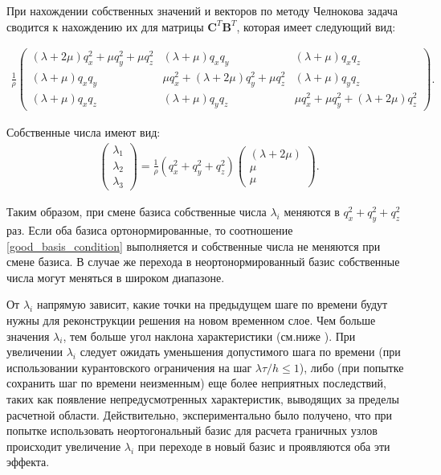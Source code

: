 При нахождении собственных значений и векторов по методу Челнокова \cite{chelnokov} задача сводится к нахождению их для матрицы $\mathbf{C}^T \mathbf{B}^T$, которая имеет следующий вид:

\begin{eqnarray}
\frac 1 \rho 
\left( \begin{array}{cccccccccccc}
(\lambda+2\mu) q_x^2 + \mu q_y^2 + \mu q_z^2 & (\lambda+\mu) q_x q_y & (\lambda+\mu) q_x q_z \\
(\lambda+\mu) q_x q_y & \mu q_x^2 + (\lambda+2\mu) q_y^2 + \mu q_z^2 & (\lambda+\mu) q_y q_z \\
(\lambda+\mu) q_x q_z & (\lambda+\mu) q_y q_z & \mu q_x^2 + \mu q_y^2 + (\lambda+2\mu) q_z^2  
\end{array} \right).
\end{eqnarray} 

Собственные числа имеют вид:
\begin{eqnarray}
\left( \begin{array}{cccccccccccc}
\lambda_1 \\
\lambda_2 \\
\lambda_3 
\end{array} \right) = 
\frac 1 \rho (q_x^2 + q_y^2 + q_z^2)
\left( \begin{array}{cccccccccccc}
(\lambda+2\mu) \\
\mu \\
\mu  
\end{array} \right).
\end{eqnarray} 

Таким образом, при смене базиса собственные числа $\lambda_i$ меняются в $q_x^2 + q_y^2 + q_z^2$ раз. Если оба базиса ортонормированные, то соотношение \ref{good_basis_condition} выполняется и собственные числа не меняются при смене базиса. В случае же перехода в неортонормированный базис собственные числа могут меняться в широком диапазоне.

От $\lambda_i$ напрямую зависит, какие точки на предыдущем шаге по времени будут нужны для реконструкции решения на новом временном слое. Чем больше значения $\lambda_i$, тем больше угол наклона характеристики (см.ниже ). При увеличении $\lambda_i$ следует ожидать уменьшения допустимого шага по времени (при использовании курантовского ограничения на шаг $\lambda\tau / h \le 1$), либо (при попытке сохранить шаг по времени неизменным) еще более неприятных последствий, таких как появление непредусмотренных характеристик, выводящих за пределы расчетной области. Действительно, экспериментально было получено, что при попытке использовать неортогональный базис для расчета граничных узлов происходит увеличение $\lambda_i$ при переходе в новый базис и проявляются оба эти эффекта.
